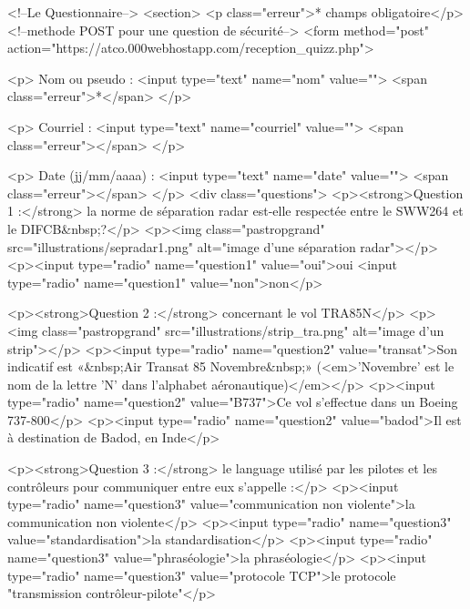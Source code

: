 \documentclass[11pt]{article}
\begin{document}
				\begin{code2}
<!--Le Questionnaire-->
		<section>
			<p class="erreur">* champs obligatoire</p>
			<!--methode POST pour une question de sécurité-->
			<form method="post" action="https://atco.000webhostapp.com/reception_quizz.php">

				<p> Nom ou pseudo : 
					<input type="text" name="nom" value=""> <span class="erreur">*</span>
				</p>

				<p> Courriel : 
					<input type="text" name="courriel" value=""> <span class="erreur"></span>
				</p>

				<p> Date (jj/mm/aaaa) : 
					<input type="text" name="date" value=""> <span class="erreur"></span>
				</p>
				<div class="questions">
					<p><strong>Question 1 :</strong> la norme de séparation radar est-elle respectée entre le SWW264 et le DIFCB&nbsp;?</p>
					<p><img class="pastropgrand" src="illustrations/sepradar1.png" alt="image d'une séparation radar"></p>
					<p><input type="radio" name="question1" value="oui">oui
						<input type="radio" name="question1" value="non">non</p>

					<p><strong>Question 2 :</strong> concernant le vol TRA85N</p>
					<p><img class="pastropgrand" src="illustrations/strip_tra.png" alt="image d'un strip"></p>
					<p><input type="radio" name="question2" value="transat">Son indicatif est «&nbsp;Air Transat 85 Novembre&nbsp;» (<em>'Novembre' est le nom de la lettre 'N' dans l'alphabet aéronautique)</em></p>
					<p><input type="radio" name="question2" value="B737">Ce vol s'effectue dans un Boeing 737-800</p>
					<p><input type="radio" name="question2" value="badod">Il est à destination de Badod, en Inde</p>

					<p><strong>Question 3 :</strong> le language utilisé par les pilotes et les contrôleurs pour communiquer entre eux s'appelle :</p>
					<p><input type="radio" name="question3" value="communication non violente">la communication non violente</p>
					<p><input type="radio" name="question3" value="standardisation">la standardisation</p>
					<p><input type="radio" name="question3" value="phraséologie">la phraséologie</p>
					<p><input type="radio" name="question3" value="protocole TCP">le protocole "transmission contrôleur-pilote"</p>\end{code2}
\end{document}
